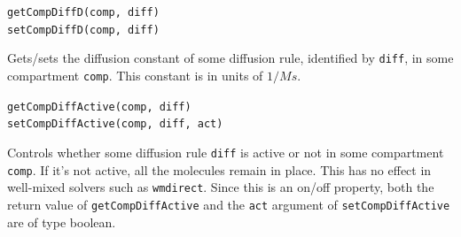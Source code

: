 \documentclass[a4paper,12pt]{book}
\begin{document}
{\texttt{getCompDiffD(comp, diff)} \\
\texttt{setCompDiffD(comp, diff)}

Gets/sets the diffusion constant of some diffusion rule, identified by \texttt{diff}, in some compartment \texttt{comp}. This constant is in units of $1/Ms$.

\texttt{getCompDiffActive(comp, diff)} \\
\texttt{setCompDiffActive(comp, diff, act)}

Controls whether some diffusion rule \texttt{diff} is active or not in some compartment \texttt{comp}. If it's not active, all the molecules remain in place. This has no effect in well-mixed solvers such as \texttt{wmdirect}. Since this is an on/off property, both the return value of \texttt{getCompDiffActive} and the \texttt{act} argument of \texttt{setCompDiffActive} are of type boolean.
}
\end{document}
